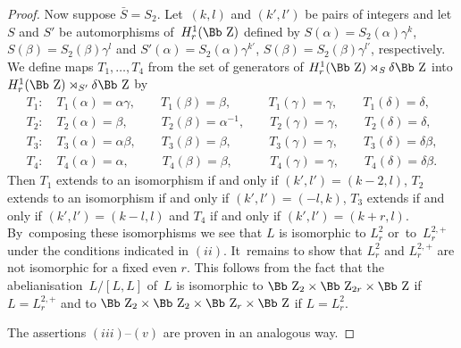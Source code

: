 \documentclass[pdftex]{sigma}
\newcommand\ZZ{{\mbox{\Bb Z}}}
\numberwithin{equation}{section}
\begin{document}
\begin{proof}
Now suppose $\bar S=S_2$. Let~$(k,l)$ and $(k',l')$ be pairs of integers and let $S$ and $S'$ be automorphisms of~$H^1_r(\ZZ)$ defined by $S(\alpha)=S_2(\alpha)\gamma^k$, $S(\beta)=S_2(\beta)\gamma^l$ and $S'(\alpha)=S_2(\alpha)\gamma^{k'}$, $S(\beta)=S_2(\beta)\gamma^{l'}$, respectively.
We define maps $T_1,\dots,T_4$ from the set of generators of $H^1_r(\ZZ)\rtimes_S \delta \ZZ$ into $H^1_r(\ZZ)\rtimes_{S'} \delta \ZZ$ by
\begin{gather*}
T_1\colon\quad T_1(\alpha)=\alpha \gamma,\qquad T_1(\beta)=\beta,\qquad \phantom{{}^{-1}}T_1(\gamma)=\gamma,\qquad T_1(\delta)=\delta,
\\
T_2\colon\quad T_2(\alpha)=\beta,\qquad \phantom{\alpha}T_2(\beta)=\alpha^{-1},\qquad T_2(\gamma)=\gamma,\qquad T_2(\delta)=\delta,
\\
T_3\colon\quad T_3(\alpha)=\alpha\beta,\qquad T_3(\beta)=\beta,\qquad \phantom{{}^{-1}}T_3(\gamma)=\gamma,\qquad T_3(\delta)=\delta\beta,
\\
T_4\colon\quad T_4(\alpha)=\alpha,\qquad \phantom{\alpha}T_4(\beta)=\beta,\qquad \phantom{{}^{-1}}T_4(\gamma)=\gamma,\qquad T_4(\delta)=\delta\beta.
\end{gather*}
Then $T_1$ extends to an isomorphism if and only if $(k',l')=(k-2,l)$, $T_2$ extends to an isomorphism if and only if $(k',l')=(-l,k)$, $T_3$ extends if and only if $(k',l')=(k-l,l)$ and $T_4$ if and only if $(k',l')=(k+r,l)$. By~composing these isomorphisms we see that $L$ is isomorphic to $L^2_r$ or~to~$L^{2,+}_r$ under the conditions indicated in $(ii)$. It~remains to show that $L_r^2$ and $L_r^{2,+}$ are not isomorphic for a fixed even $r$. This follows from the fact that the abelianisation~$L/[L,L]$ of~$L$ is isomorphic to $\ZZ_2\times\ZZ_{2r}\times\ZZ$ if $L=L^{2,+}_{r}$ and to $\ZZ_2\times\ZZ_2\times\ZZ_r\times\ZZ$ if $L=L^2_{r}$.

The assertions $(iii)$--$(v)$ are proven in an analogous way.
\end{proof}
\end{document}
